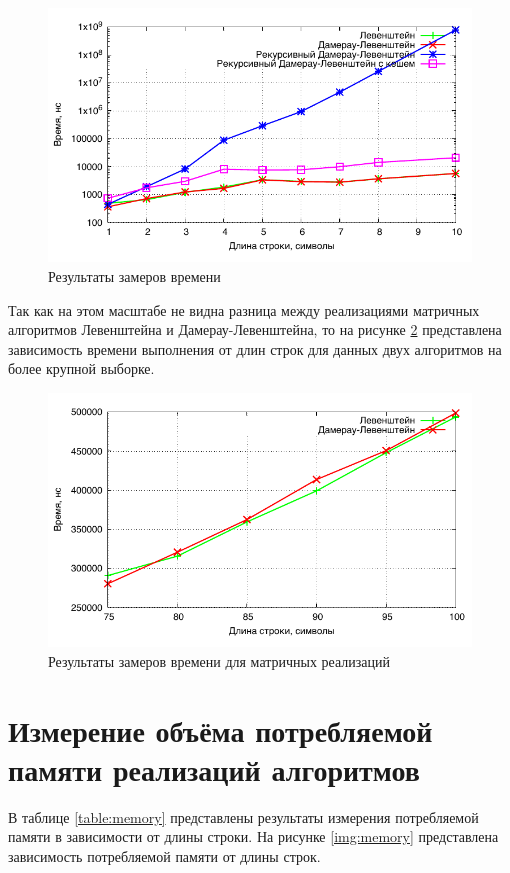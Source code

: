 \newpage

\noindent
\begin{figure}[h!]
	\centering
    \includegraphics[width=0.75\linewidth]{../data/time}
    \caption{Результаты замеров времени}
    \label{img:time}
\end{figure}

Так как на этом масштабе не видна разница между реализациями матричных алгоритмов Левенштейна и Дамерау-Левенштейна, то на рисунке \ref{img:time_matrix} представлена зависимость времени выполнения от длин строк для данных двух алгоритмов на более крупной выборке.

\noindent
\begin{figure}[h!]
	\centering
    \includegraphics[width=0.75\linewidth]{../data/time_matrix}
    \caption{Результаты замеров времени для матричных реализаций}
    \label{img:time_matrix}
\end{figure}

\newpage


\section{Измерение объёма потребляемой памяти реализаций алгоритмов}

В таблице \ref{table:memory} представлены результаты измерения потребляемой памяти в зависимости от длины строки. На рисунке \ref{img:memory} представлена зависимость потребляемой памяти от длины строк.

